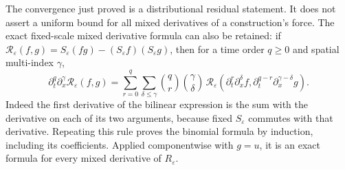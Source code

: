 The convergence just proved is a distributional residual statement. It does
not assert a uniform bound for all mixed derivatives of a construction's force.
The exact fixed-scale mixed derivative formula can also be retained: if
$\mathcal R_\varepsilon(f,g)=S_\varepsilon(fg)-(S_\varepsilon f)(S_\varepsilon g)$,
then for a time order $q\ge0$ and spatial multi-index $\gamma$,
\begin{equation}\label{ipmc:mixed}
\partial_t^q\partial_x^\gamma\mathcal R_\varepsilon(f,g)
=\sum_{r=0}^q\sum_{\delta\le\gamma}
\binom qr\binom\gamma\delta\,
\mathcal R_\varepsilon(
\partial_t^r\partial_x^\delta f,
\partial_t^{q-r}\partial_x^{\gamma-\delta}g).
\end{equation}
Indeed the first derivative of the bilinear expression is the sum with the
derivative on each of its two arguments, because fixed $S_\varepsilon$
commutes with that derivative. Repeating this rule proves the binomial formula
by induction, including its coefficients. Applied componentwise with
$g=u$, it is an exact formula for every mixed derivative of $R_\varepsilon$.

